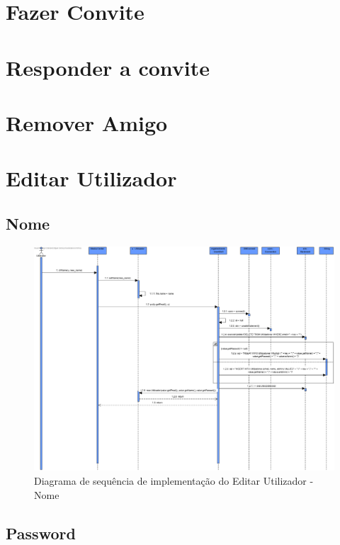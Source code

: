\documentclass[a4paper]{report}
\begin{document}
\section{Fazer Convite}

\section{Responder a convite}

\section{Remover Amigo}

\section{Editar Utilizador}

\subsection{Nome}

\begin{figure}[H]
	\centering 
    \includegraphics[width=\textwidth]{images/editUserNameImp.png}  
    \caption{Diagrama de sequência de implementação do Editar Utilizador - Nome}
\end{figure}

\subsection{Password}
\end{document}
